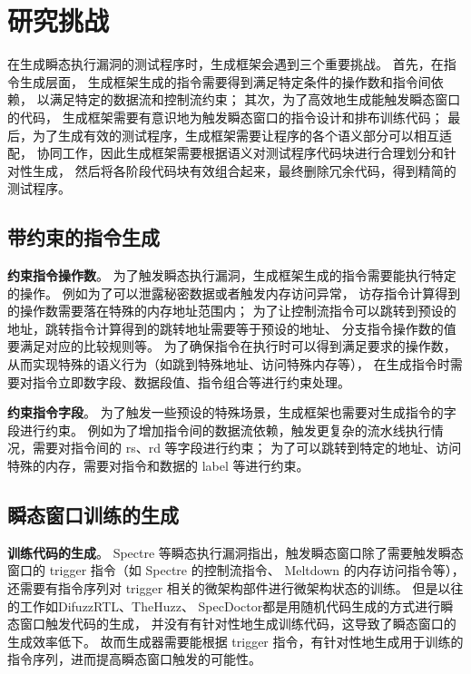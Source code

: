 \cleardoublepage
\section{研究挑战}

在生成瞬态执行漏洞的测试程序时，生成框架会遇到三个重要挑战。
首先，在指令生成层面，
生成框架生成的指令需要得到满足特定条件的操作数和指令间依赖，
以满足特定的数据流和控制流约束；
其次，为了高效地生成能触发瞬态窗口的代码，
生成框架需要有意识地为触发瞬态窗口的指令设计和排布训练代码；
最后，为了生成有效的测试程序，生成框架需要让程序的各个语义部分可以相互适配，
协同工作，因此生成框架需要根据语义对测试程序代码块进行合理划分和针对性生成，
然后将各阶段代码块有效组合起来，最终删除冗余代码，得到精简的测试程序。\par

\subsection{带约束的指令生成}
\textbf{约束指令操作数}。
为了触发瞬态执行漏洞，生成框架生成的指令需要能执行特定的操作。
例如为了可以泄露秘密数据或者触发内存访问异常，
访存指令计算得到的操作数需要落在特殊的内存地址范围内；
为了让控制流指令可以跳转到预设的地址，跳转指令计算得到的跳转地址需要等于预设的地址、
分支指令操作数的值要满足对应的比较规则等。
为了确保指令在执行时可以得到满足要求的操作数，从而实现特殊的语义行为（如跳到特殊地址、访问特殊内存等），
在生成指令时需要对指令立即数字段、数据段值、指令组合等进行约束处理。\par

\textbf{约束指令字段}。
为了触发一些预设的特殊场景，生成框架也需要对生成指令的字段进行约束。
例如为了增加指令间的数据流依赖，触发更复杂的流水线执行情况，需要对指令间的 rs、rd 等字段进行约束；
为了可以跳转到特定的地址、访问特殊的内存，需要对指令和数据的 label 等进行约束。\par

\subsection{瞬态窗口训练的生成}
\textbf{训练代码的生成}。
Spectre 等瞬态执行漏洞指出，触发瞬态窗口除了需要触发瞬态窗口的 trigger 指令（如 Spectre 的控制流指令、
Meltdown 的内存访问指令等），还需要有指令序列对 trigger 相关的微架构部件进行微架构状态的训练。
但是以往的工作如DifuzzRTL\cite{hur2021difuzzrtl}、TheHuzz\cite{kande2022thehuzz}、
SpecDoctor\cite{hur2022specdoctor}都是用随机代码生成的方式进行瞬态窗口触发代码的生成，
并没有有针对性地生成训练代码，这导致了瞬态窗口的生成效率低下。
故而生成器需要能根据 trigger 指令，有针对性地生成用于训练的指令序列，进而提高瞬态窗口触发的可能性。\par

